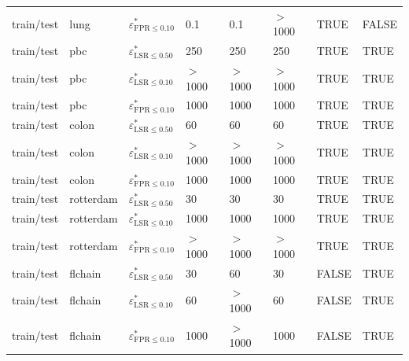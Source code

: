 \begin{tabular}{llllllll}
  train/test & lung & $\varepsilon^{*}_{\mathrm{FPR} \leq 0.10}$ & 0.1 & 0.1 & $>$ 1000 & TRUE & FALSE \\ 
  train/test & pbc & $\varepsilon^{*}_{\mathrm{LSR} \leq 0.50}$ & 250 & 250 & 250 & TRUE & TRUE \\ 
  train/test & pbc & $\varepsilon^{*}_{\mathrm{LSR} \leq 0.10}$ & $>$ 1000 & $>$ 1000 & $>$ 1000 & TRUE & TRUE \\ 
  train/test & pbc & $\varepsilon^{*}_{\mathrm{FPR} \leq 0.10}$ & 1000 & 1000 & 1000 & TRUE & TRUE \\ 
  train/test & colon & $\varepsilon^{*}_{\mathrm{LSR} \leq 0.50}$ & 60 & 60 & 60 & TRUE & TRUE \\ 
  train/test & colon & $\varepsilon^{*}_{\mathrm{LSR} \leq 0.10}$ & $>$ 1000 & $>$ 1000 & $>$ 1000 & TRUE & TRUE \\ 
  train/test & colon & $\varepsilon^{*}_{\mathrm{FPR} \leq 0.10}$ & 1000 & 1000 & 1000 & TRUE & TRUE \\ 
  train/test & rotterdam & $\varepsilon^{*}_{\mathrm{LSR} \leq 0.50}$ & 30 & 30 & 30 & TRUE & TRUE \\ 
  train/test & rotterdam & $\varepsilon^{*}_{\mathrm{LSR} \leq 0.10}$ & 1000 & 1000 & 1000 & TRUE & TRUE \\ 
  train/test & rotterdam & $\varepsilon^{*}_{\mathrm{FPR} \leq 0.10}$ & $>$ 1000 & $>$ 1000 & $>$ 1000 & TRUE & TRUE \\ 
  train/test & flchain & $\varepsilon^{*}_{\mathrm{LSR} \leq 0.50}$ & 30 & 60 & 30 & FALSE & TRUE \\ 
  train/test & flchain & $\varepsilon^{*}_{\mathrm{LSR} \leq 0.10}$ & 60 & $>$ 1000 & 60 & FALSE & TRUE \\ 
  train/test & flchain & $\varepsilon^{*}_{\mathrm{FPR} \leq 0.10}$ & 1000 & $>$ 1000 & 1000 & FALSE & TRUE \\ 
   \bottomrule
\end{tabular}
